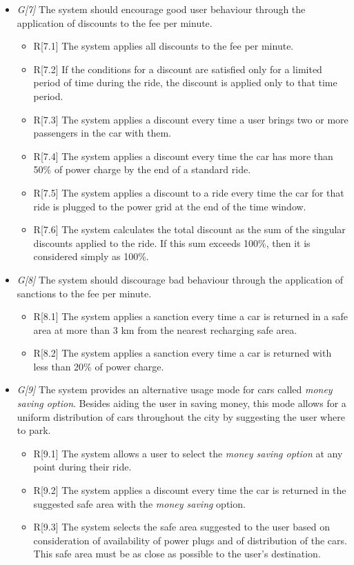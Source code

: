 \begin{itemize}
				\item \textit{G[7]} The system should encourage good user behaviour through the application of discounts to the fee per minute. 
					\begin{itemize}
						\item R[7.1] The system applies all discounts to the fee per minute.
						\item R[7.2] If the conditions for a discount are satisfied only for a limited period of time during the ride, the discount is applied only to that time period. %
						\item R[7.3] The system applies a discount every time a user brings two or more passengers in the car with them.
						\item R[7.4] The system applies a discount every time the car has more than 50\% of power charge by the end of a standard ride. %
						\item R[7.5] The system applies a discount to a ride every time the car for that ride is plugged to the power grid at the end of the time window. 
						\item R[7.6] The system calculates the total discount as the sum of the singular discounts applied to the ride. If this sum exceeds 100\%, then it is considered simply as 100\%.
					\end{itemize}
					
				\item \textit{G[8]} The system should discourage bad behaviour through the application of sanctions to the fee per minute.
					\begin{itemize}
						\item R[8.1] The system applies a sanction every time a car is returned in a safe area at more than 3 km from the nearest recharging safe area.
						\item R[8.2] The system applies a sanction every time a car is returned with less than 20\% of power charge.
					\end{itemize}
					
				\item \textit{G[9]} The system provides an alternative usage mode for cars called \textit{money saving option}. Besides aiding the user in saving money, this mode allows for a uniform distribution of cars throughout the city by suggesting the user where to park.
					\begin{itemize}
						\item R[9.1] The system allows a user to select the \textit{money saving option} at any point during their ride. 
						\item R[9.2] The system applies a discount every time the car is returned in the suggested safe area with the \textit{money saving} option.
						\item R[9.3] The system selects the safe area suggested to the user based on consideration of availability of power plugs and of distribution of the cars. This safe area must be as close as possible to the user's destination. %
					\end{itemize}
					

\end{itemize}

